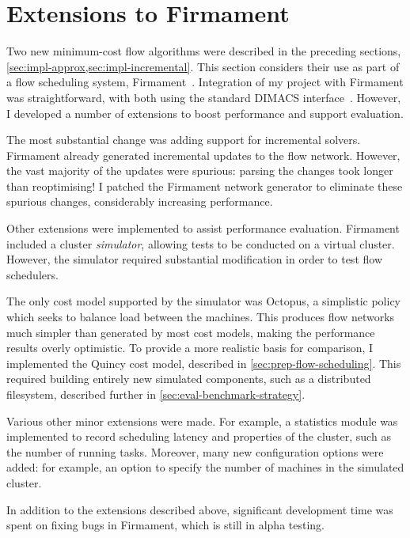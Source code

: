 \section{Extensions to Firmament} \label{sec:impl-firmament}


Two new minimum-cost flow algorithms were described in the preceding sections, \cref{sec:impl-approx,sec:impl-incremental}. This section considers their use as part of a flow scheduling system, Firmament~\cite[ch.~5]{Schwarzkopf:2015}. Integration of my project with Firmament was straightforward, with both using the standard DIMACS interface~\cite{DIMACSStandard}. However, I developed a number of extensions to boost performance and support evaluation.

The most substantial change was adding support for incremental solvers. Firmament already generated incremental updates to the flow network. However, the vast majority of the updates were spurious: parsing the changes took longer than reoptimising! I patched the Firmament network generator to eliminate these spurious changes, considerably increasing performance.

Other extensions were implemented to assist performance evaluation. Firmament included a cluster \emph{simulator}, allowing tests to be conducted on a virtual cluster. However, the simulator required substantial modification in order to test flow schedulers.

The only cost model supported by the simulator was Octopus, a simplistic policy which seeks to balance load between the machines. This produces flow networks much simpler than generated by most cost models, making the performance results overly optimistic. To provide a more realistic basis for comparison, I implemented the Quincy cost model, described in \cref{sec:prep-flow-scheduling}. This required building entirely new simulated components, such as a distributed filesystem, described further in \cref{sec:eval-benchmark-strategy}.

Various other minor extensions were made. For example, a statistics module was implemented to record scheduling latency and properties of the cluster, such as the number of running tasks. Moreover, many new configuration options were added: for example, an option to specify the number of machines in the simulated cluster.

In addition to the extensions described above, significant development time was spent on fixing bugs in Firmament, which is still in alpha testing.

